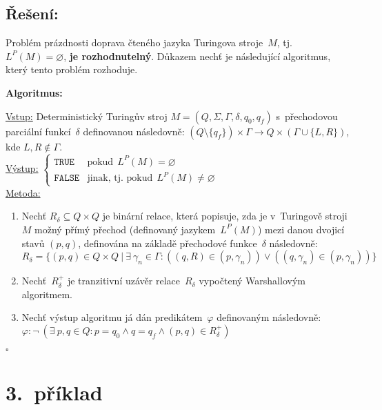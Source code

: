 \documentclass[a4paper, 11pt]{scrartcl}
\newcommand*{\QEDB}{\hfill\ensuremath{\square}}
\begin{document}
	\subsection*{Řešení:}

	Problém prázdnosti doprava čteného jazyka Turingova stroje~$ M $, tj.
	$ L^P(M) = \varnothing $, \textbf{je rozhodnutelný}. Důkazem nechť
	je následující algoritmus, který tento problém rozhoduje.

	\textbf{Algoritmus:}
	\begin{addmargin}[10pt]{0pt}
		\underline{Vstup:}
			Deterministický Turingův stroj $ M = (Q, \Sigma, \Gamma,
			\delta, q_0, q_f) $ s~přechodovou parciální funkcí~$ \delta $
			definovanou následovně: $ (Q \setminus \{q_f\}) \times
			\Gamma \rightarrow Q \times (\Gamma \cup \{L, R\}) $, kde
			$ L, R \notin \Gamma $.
		\\[5pt]
		\underline{Výstup:}
			$
				\begin{cases}
					\mathtt{TRUE} &
					\text{pokud}\ \ L^P(M) = \varnothing \\
					\mathtt{FALSE} &
					\text{jinak, tj. pokud}\ \ L^P(M) \neq \varnothing
				\end{cases}
			$
		\\[5pt]
		\underline{Metoda:}
			\begin{enumerate}
				\item
					Nechť $ R_\delta \subseteq Q \times Q $ je binární
					relace, která popisuje, zda je v~Turingově
					stroji~$ M $ možný přímý přechod (definovaný
					jazykem~$ L^P(M) $) mezi danou dvojicí stavů $ (p,
					q) $, definována na základě přechodové funkce~$
					\delta $ následovně: \\
					$ R_\delta = \{(p, q) \in Q \times Q\ |\ \exists\
					\gamma_n \in \Gamma : ((q, R) \in (p, \gamma_n))
					\vee ((q, \gamma_n) \in (p, \gamma_n))\} $

				\item
					Nechť~$ R_\delta^+ $ je tranzitivní uzávěr
					relace~$ R_\delta $ vypočtený Warshallovým
					algoritmem.

				\item
					Nechť výstup algoritmu já dán predikátem~$ \varphi $
					definovaným následovně: \\
					$ \varphi : \neg\ (\exists\ p, q \in Q : p = q_0
					\wedge q = q_f \wedge (p, q) \in R_\delta^+) $
			\end{enumerate}
	\end{addmargin}
	\QEDB


	\section*{3.~příklad}
\end{document}
